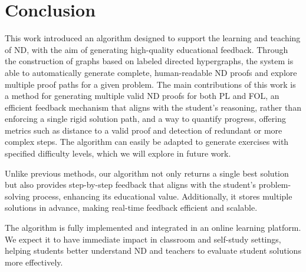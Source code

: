 \section{Conclusion}
This work introduced an algorithm designed to support the learning and teaching of ND, with the aim of generating high-quality educational feedback. Through the construction of graphs based on labeled directed hypergraphs, the system is able to automatically generate complete, human-readable ND proofs and explore multiple proof paths for a given problem.
The main contributions of this work is a method for generating multiple valid ND proofs for both PL and FOL, an efficient feedback mechanism that aligns with the student’s reasoning, rather than enforcing a single rigid solution path, and a way to quantify progress, offering metrics such as distance to a valid proof and detection of redundant or more complex steps.
The algorithm can easily be adapted to generate exercises with specified difficulty levels, which we will explore in future work.

Unlike previous methods, our algorithm not only returns a single best solution but also provides step-by-step feedback that aligns with the student’s problem-solving process, enhancing its educational value. Additionally, it stores multiple solutions in advance, making real-time feedback efficient and scalable.

The algorithm is fully implemented and integrated in an online learning platform. We expect it to have immediate impact in classroom and self-study settings, helping students better understand ND and teachers to evaluate student solutions more effectively.